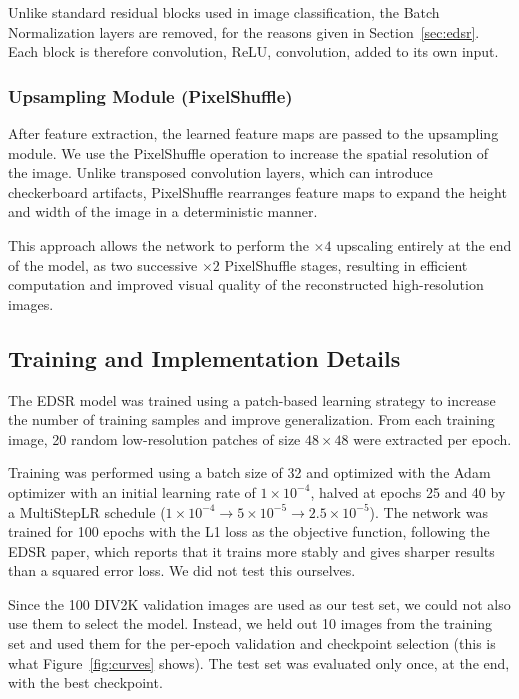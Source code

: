 \documentclass[a4paper,11pt]{article}
\begin{document}
\medskip


Unlike standard residual blocks used in image classification, the Batch Normalization layers
are removed, for the reasons given in Section~\ref{sec:edsr}. Each block is therefore
convolution, ReLU, convolution, added to its own input.


\subsubsection{Upsampling Module (PixelShuffle)}

After feature extraction, the learned feature maps are passed to the upsampling
module. We use the PixelShuffle operation to increase the spatial resolution of the
image. Unlike transposed convolution layers, which can introduce checkerboard
artifacts, PixelShuffle rearranges feature maps to expand the height and width of the
image in a deterministic manner.

\medskip


This approach allows the network to perform the $\times4$ upscaling entirely at the end
of the model, as two successive $\times2$ PixelShuffle stages, resulting in efficient
computation and improved visual quality of the reconstructed high-resolution images.

\subsection{Training and Implementation Details}

The EDSR model was trained using a patch-based learning strategy to increase the
number of training samples and improve generalization. From each training image,
20 random low-resolution patches of size $48 \times 48$ were extracted per epoch.

\medskip


Training was performed using a batch size of 32 and optimized with the Adam
optimizer with an initial learning rate of $1 \times 10^{-4}$, halved at epochs
25 and 40 by a MultiStepLR schedule
($1 \times 10^{-4} \rightarrow 5 \times 10^{-5} \rightarrow 2.5 \times 10^{-5}$).
The network was trained for 100 epochs with the L1 loss as the objective
function, following the EDSR paper, which reports that it trains more stably and gives sharper
results than a squared error loss. We did not test this ourselves.
\medskip

Since the 100 DIV2K validation images are used as our test set, we could not
also use them to select the model. Instead, we held out 10 images from the
training set and used them for the per-epoch validation and checkpoint
selection (this is what Figure~\ref{fig:curves} shows). The test set was evaluated
only once, at the end, with the best checkpoint.
\end{document}
